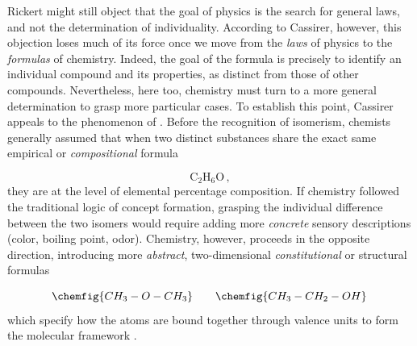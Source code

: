\documentclass[submitted,12pt]{article}
\renewcommand{\SF}[2]{\citep[#1/#2]{Cassirer1910}}
\begin{document}
 



Rickert might still object that the goal of physics is the search for general laws, and not the determination of individuality. According to Cassirer, however, this objection loses much of its force once we move from the \emph{laws} of physics to the \emph{formulas} of chemistry. Indeed, the goal of the formula is precisely to identify an individual compound and its properties, as distinct from those of other compounds. Nevertheless, here too, chemistry must turn to a more general determination to grasp more particular cases. To establish this point, Cassirer appeals to the phenomenon of  . Before the recognition of isomerism, chemists generally assumed that when two distinct substances share the exact same empirical or \emph{compositional} formula

\begin{equation*}
\mathrm{C}_2 \mathrm{H}_6 \mathrm{O}\,,
\end{equation*}
%
they are  at the level of elemental percentage composition. If chemistry followed the traditional logic of concept formation, grasping the individual difference between the two isomers would require adding more \emph{concrete} sensory descriptions (color, boiling point, odor). Chemistry, however, proceeds in the opposite direction, introducing more \emph{abstract}, two-dimensional \emph{constitutional} or structural formulas 

\begin{equation*}
\chemfig{CH_3-O-CH_3} \quad \quad \chemfig{CH_3-CH_2-OH}\,
\end{equation*}
%
which specify how the atoms are bound together through valence units to form the molecular framework \SF{276}{207}. 
\end{document}
